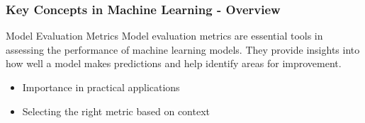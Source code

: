 \documentclass[aspectratio=169]{beamer}
\begin{document}
\begin{frame}[fragile]
    \frametitle{Key Concepts in Machine Learning - Overview}
    \begin{block}{Model Evaluation Metrics}
        Model evaluation metrics are essential tools in assessing the performance of machine learning models. They provide insights into how well a model makes predictions and help identify areas for improvement.
    \end{block}
    
    \vspace{0.5cm}
    
    \begin{itemize}
        \item Importance in practical applications
        \item Selecting the right metric based on context
    \end{itemize}
\end{frame}
\end{document}
